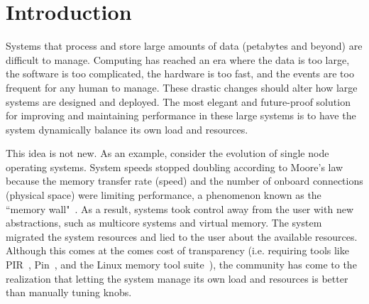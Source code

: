 \chapter{Introduction}
Systems that process and store large amounts of data (peta\-bytes and beyond) are difficult to manage. Computing has reached an era where the data is too large, the software is too complicated, the hardware is too fast, and the events are too frequent for any human to manage. These drastic changes should alter how large systems are designed and deployed. The most elegant and future-proof solution for improving and maintaining performance in these large systems is to have the system dynamically balance its own load and resources.  

This idea is not new. As an example, consider the evolution of single node operating systems. System speeds stopped doubling according to Moore's law because the memory transfer rate (speed) and the number of onboard connections (physical space) were limiting performance, a phenomenon known as the ``memory wall"~\cite{wulf:sigarch1995-memory-wall}. As a result, systems took control away from the user with new abstractions, such as multicore systems and virtual memory. The system migrated the system resources and lied to the user about the available resources. Although this comes at the comes cost of transparency (i.e. requiring tools like PIR~\cite{olschanowsky:ICPPW2010-PIR}, Pin~\cite{luk:PLDI2005-pin}, and the Linux memory tool suite~\cite{movall:atec2005-physical}), the community has come to the realization that letting the system manage its own load and resources is better than manually tuning knobs. 

